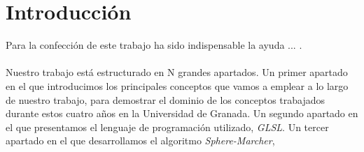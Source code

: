 \chapter{Introducción}
Para la confección de este trabajo ha sido indispensable la ayuda ... .\\\\
Nuestro trabajo está estructurado en N grandes apartados. Un primer apartado en el que introducimos los principales conceptos que vamos a emplear a lo largo de nuestro trabajo, para demostrar el dominio de los conceptos trabajados durante estos cuatro años en la Universidad de Granada. Un segundo apartado en el que presentamos el lenguaje de programación utilizado, \textit{GLSL}. Un tercer apartado en el que desarrollamos el algoritmo \textit{Sphere-Marcher}, 
